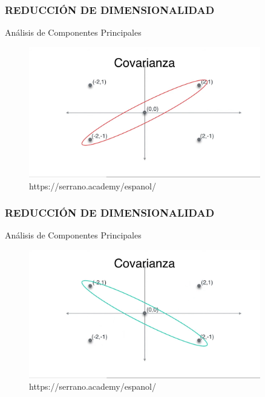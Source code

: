 \documentclass{beamer}
\begin{document}
\begin{frame}
	\frametitle{REDUCCIÓN DE DIMENSIONALIDAD}
	\begin{block}{Análisis de Componentes Principales}	
		\begin{figure}
			\includegraphics[width=0.9\textwidth]{PCA/IMG_3553.jpg}
			\caption{https://serrano.academy/espanol/}
		\end{figure}
	\end{block}
\end{frame}

\begin{frame}
	\frametitle{REDUCCIÓN DE DIMENSIONALIDAD}
	\begin{block}{Análisis de Componentes Principales}	
		\begin{figure}
			\includegraphics[width=0.9\textwidth]{PCA/IMG_3554.jpg}
			\caption{https://serrano.academy/espanol/}
		\end{figure}
	\end{block}
\end{frame}
\end{document}
